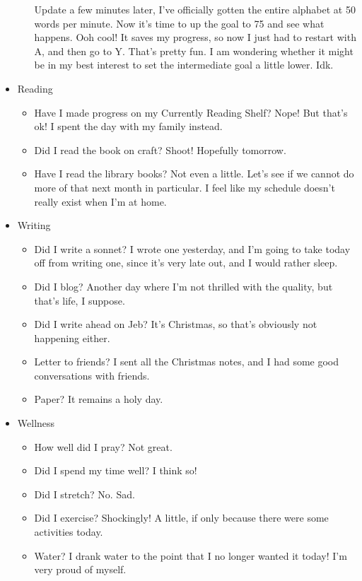 \documentclass[12pt]{article}[titlepage]
\newcommand{\1}{\={a}}
\newcommand{\2}{\={e}}
\newcommand{\3}{\={\i}}
\newcommand{\4}{\=o}
\newcommand{\5}{\=u}
\newcommand{\6}{\={A}}
\renewcommand{\,}{\textsuperscript{,}}
\begin{document}
\begin{itemize}
\begin{itemize}
Update a few minutes later, I've officially gotten the entire alphabet at 50 words per minute. Now it's time to up the goal to 75 and see what happens.
Ooh cool! It saves my progress, so now I just had to restart with A, and then go to Y. That's pretty fun.
I am wondering whether it might be in my best interest to set the intermediate goal a little lower.
Idk.
\end{itemize}
\item Reading
\begin{itemize}
\item Have I made progress on my Currently Reading Shelf? Nope! But that's ok! I spent the day with my family instead.
\item Did I read the book on craft? Shoot! Hopefully tomorrow.
\item Have I read the library books? Not even a little. Let's see if we cannot do more of that next month in particular. I feel like my schedule doesn't really exist when I'm at home.
\end{itemize}
\item Writing
\begin{itemize}
\item Did I write a sonnet? I wrote one yesterday, and I'm going to take today off from writing one, since it's very late out, and I would rather sleep.
\item Did I blog? Another day where I'm not thrilled with the quality, but that's life, I suppose.
\item Did I write ahead on Jeb? It's Christmas, so that's obviously not happening either.
\item Letter to friends? I sent all the Christmas notes, and I had some good conversations with friends.
\item Paper? It remains a holy day.
\end{itemize}
\item Wellness
\begin{itemize}
\item How well did I pray? Not great.
\item Did I spend my time well? I think so!
\item Did I stretch? No. Sad.
\item Did I exercise? Shockingly! A little, if only because there were some activities today.
\item Water? I drank water to the point that I no longer wanted it today! I'm very proud of myself.
\end{itemize}
\end{itemize}
\end{document}
